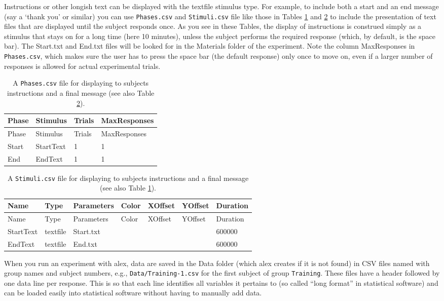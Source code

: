 \documentclass[11pt,]{article}
\begin{document}
Instructions or other longish text can be displayed with the textfile
stimulus type. For example, to include both a start and an end message
(say a `thank you' or similar) you can use \texttt{Phases.csv} and
\texttt{Stimuli.csv} file like those in Tables \ref{phases-instructions}
and \ref{stimuli-instructions} to include the presentation of text files
that are displayed until the subject responds once. As you see in these
Tables, the display of instructions is construed simply as a stimulus
that stays on for a long time (here 10 minutes), unless the subject
performs the required response (which, by default, is the space bar).
The Start.txt and End.txt files will be looked for in the Materials
folder of the experiment. Note the column MaxResponses in
\texttt{Phases.csv}, which makes sure the user has to press the space
bar (the default response) only once to move on, even if a larger number
of responses is allowed for actual experimental trials.

\begin{longtable}[c]{@{}llll@{}}
\caption{A \texttt{Phases.csv} file for displaying to subjects
instructions and a final message (see also Table
\ref{stimuli-instructions}). \label{phases-instructions}}\tabularnewline
\toprule
Phase & Stimulus & Trials & MaxResponses\tabularnewline
\midrule
\endfirsthead
\toprule
Phase & Stimulus & Trials & MaxResponses\tabularnewline
\midrule
\endhead
Start & StartText & 1 & 1\tabularnewline
End & EndText & 1 & 1\tabularnewline
\bottomrule
\end{longtable}

\begin{longtable}[c]{@{}lllllll@{}}
\caption{A \texttt{Stimuli.csv} file for displaying to subjects
instructions and a final message (see also Table
\ref{phases-instructions}). \label{stimuli-instructions}}\tabularnewline
\toprule
Name & Type & Parameters & Color & XOffset & YOffset &
Duration\tabularnewline
\midrule
\endfirsthead
\toprule
Name & Type & Parameters & Color & XOffset & YOffset &
Duration\tabularnewline
\midrule
\endhead
StartText & textfile & Start.txt & & & & 600000\tabularnewline
EndText & textfile & End.txt & & & & 600000\tabularnewline
\bottomrule
\end{longtable}


When you run an experiment with alex, data are saved in the Data folder
(which alex creates if it is not found) in CSV files named with group
names and subject numbers, e.g., \texttt{Data/Training-1.csv} for the
first subject of group \texttt{Training}. These files have a header
followed by one data line per response. This is so that each line
identifies all variables it pertains to (so called ``long format'' in
statistical software) and can be loaded easily into statistical software
without having to manually add data.
\end{document}
